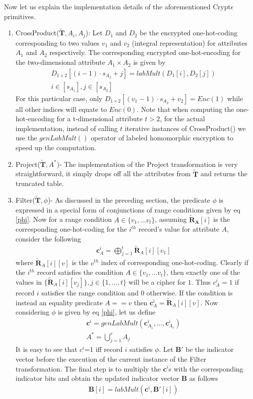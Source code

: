 Now let us explain the implementation details of the aforementioned Crypt$\epsilon$ primitives. 
\begin{enumerate}\item \textsf{CrossProduct}($\tilde{\mathbf{T}}, A_i, A_j$): Let $D_1$ and $D_2$  be the encrypted one-hot-coding corresponding to two  values $v_1$ and $v_2$ (integral representation) for attributes $A_1$ and $A_2$ respectively. The corresponding encrypted one-hot-encoding for the two-dimensional attribute $A_1\times A_2$ is given by  \begin{gather} D_{1\times 2}[(i-1)\cdot s_{A_2}+j] = labMult(D_1[i], D_2[j])\\ i \in [s_{A_1}], j \in [s_{A_2}]\end{gather} For this particular case, only $D_{1 \times 2}[(v_1-1)\cdot s_{A_2}+v_2]=Enc(1)$ while all other indices will equate to $Enc(0)$. Note that when computing the one-hot-encoding for a t-dimensional attribute $t > 2$,  for the actual implementation, instead of calling $t$ iterative instances of \textsf{CrossProduct}() we use the $genLabMult()$ operator of labeled homomorphic encryption to speed up the computation. \item \textsf{Project}($\tilde{\mathbf{T}}, A^*$)- The implementation of the \textsf{Project} transformation is very straightforward, it simply drops off all the attributes from $\tilde{\mathbf{T}}$ and returns the truncated table. \item \textsf{Filter}($\mathbf{\tilde{T}},\phi$)-  As discussed in the preceding section, the predicate $\phi$ is expressed in a special form of conjunctions of range conditions given by eq \ref{phi}. Now for a range condition $A \in \{v_1,...v_t\}$, assuming $\mathbf{\tilde{R}_A}[i]$ is the corresponding one-hot-coding for the $i^{th}$ record's value for attribute $A$,  consider the following \begin{gather}\mathbf{c}_A^i=\bigoplus_{j=1}^{t}\tilde{\mathbf{R}}_{A}[i][v_1]\end{gather} where $\tilde{\mathbf{R}}_{A}[i][v]$ is the $v^{th}$ index of corresponding one-hot-coding. Clearly if the $i^{th}$ record satisfies the condition $A \in \{v_1,...v_t\}$, then exactly one of the values in $\{\tilde{\mathbf{R}}_{A}[i][v_j]\}, j \in \{1,...,t\}$ will be a cipher for $1$. Thus $c_A^i=1$ if record $i$ satisfies the range condition and 0 otherwise. If the condition is instead an equality predicate $A==v$ then $\mathbf{c}_A^i=\tilde{\mathbf{R}}_{A}[i][v]$. Now considering $\phi$ is given by eq \ref{phi}, let us define\begin{gather}\mathbf{c}^i=genLabMult(\mathbf{c}^i_{A_1},...,\mathbf{c}^i_{A_r})\\A^*=\bigcup_{j=1}^rA_j\end{gather} It is easy to see that $c^i$=1 iff record $i$ satisfies $\phi$. Let $\mathbf{B}'$ be the indicator vector before the execution of the current instance of the \textsf{Filter} transformation. The final step is to multiply the $\mathbf{c}^i$s with the corresponding indicator bits and obtain the updated indicator vector $\mathbf{B}$ as follows \begin{gather}\mathbf{B}[i]=labMult(\mathbf{c}^i,\mathbf{B}'[i])\end{gather} 

\end{enumerate}

